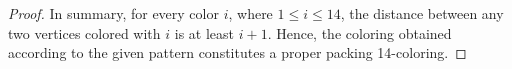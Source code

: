 \documentclass{article}
\newtheorem{theorem}{Theorem}
\begin{document}
\begin{proof}
In summary, for every color $i$, where $1 \leq i \leq 14$, the distance between any two vertices colored with $i$ is at least $i+1$. Hence, the coloring obtained according to the given pattern constitutes a proper packing 14-coloring.
\end{proof}






\end{document}
